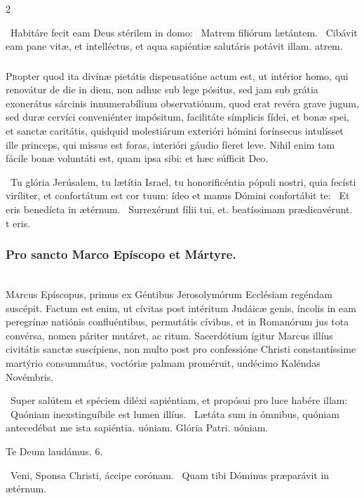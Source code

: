 \documentclass[9pt,twoside]{extarticle}
\begin{document}
\begin{multicols}{2}
\begin{tightlist}{}
\item {}~Habitáre fecit eam Deus stérilem in domo: \textred{*}~Matrem filiórum lætántem. ~Cibávit eam pane vitæ, et intelléctus, et aqua sapiéntiæ salutáris potávit illam. atrem.
\end{tightlist}

\subsubsection*{\center {}}
\lettrine{P}ropter quod ita divínæ pietátis dispensatióne actum est, ut intérior homo, qui renovátur de die in diem, non adhuc sub lege pósitus, sed jam sub grátia exonerátus sárcinis innumerabílium observatiónum, quod erat revéra grave jugum, sed duræ cervíci conveniénter impósitum, facilitáte símplicis fídei, et bonæ spei, et sanctæ caritátis, quidquid molestiárum exterióri hómini forínsecus intulísset ille princeps, qui missus est foras, interióri gáudio fíeret leve. Nihil enim tam fácile bonæ voluntáti est, quam ipsa sibi: et hæc súfficit Deo.

\begin{tightlist}{}
\item {}~Tu glória Jerúsalem, tu lætítia Israel, tu honorificéntia pópuli nostri, quia fecísti viríliter, et confortátum est cor tuum: ídeo et manus Dómini confortábit te: \textred{*}~Et eris benedícta in ætérnum. ~Surrexérunt fílii tui, et. beatíssimam prædicavérunt. t eris.
\end{tightlist}

\subsubsection*{\center Pro sancto Marco Epíscopo et Mártyre.}
\\
\lettrine{M}arcus Epíscopus, primus ex Géntibus Jerosolymórum Ecclésiam regéndam suscépit. Factum est enim, ut cívitas post intéritum Judáicæ genis, íncolis in eam peregrínæ natiónis confluéntibus, permutátis cívibus, et in Romanórum jus tota convérsa, nomen páriter mutáret, ac ritum. Sacerdótium ígitur Marcus illíus civitátis sanctæ suscípiens, non multo post pro confessióne Christi constantíssime martýrio consummátus, voctóriæ palmam proméruit, undécimo Kaléndas Novémbris.

\begin{tightlist}{}
\item {}~Super salútem et spéciem diléxi sapiéntiam, et propósui pro luce habére illam: \textred{*}~Quóniam inexstinguíbile est lumen illíus. ~Lætáta sum in ómnibus, quóniam antecedébat me ista sapiéntia. uóniam. Glória Patri. uóniam.
\item Te Deum laudámus. 6.
\item {}~Veni, Sponsa Christi, áccipe corónam. ~Quam tibi Dóminus præparávit in ætérnum.
\end{tightlist}


\end{multicols}
\end{document}
